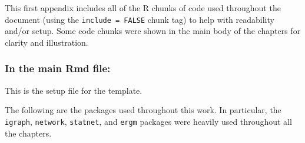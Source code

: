 \documentclass[12pt,twoside]{amherstthesis}
\begin{document}
  This first appendix includes all of the R chunks of code used throughout
  the document (using the \texttt{include\ =\ FALSE} chunk tag) to help
  with readability and/or setup. Some code chunks were shown in the main
  body of the chapters for clarity and illustration.
  
  \subsubsection{In the main Rmd file:}\label{in-the-main-rmd-file}
  
  This is the setup file for the template.
  
  \begin{Shaded}
  \begin{Highlighting}[]
    \NormalTok{(}\NormalTok{, } \NormalTok{)}
    \NormalTok{(}\NormalTok{)}
  \NormalTok{\}}
  \end{Highlighting}
  \end{Shaded}
  
  The following are the packages used throughout this work. In particular,
  the \texttt{igraph}, \texttt{network}, \texttt{statnet}, and
  \texttt{ergm} packages were heavily used throughout all the chapters.
  
  \begin{Shaded}
  \begin{Highlighting}[]
  
  \NormalTok{(} \NormalTok{)}
  \NormalTok{(} \NormalTok{)}
  \end{Highlighting}
  \end{Shaded}
  
\end{document}
